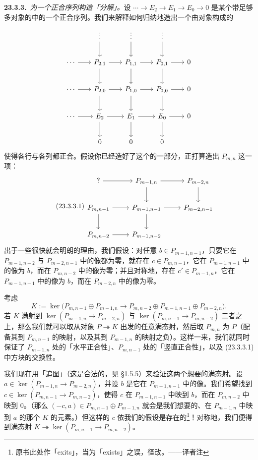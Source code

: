 \textbf{23.3.3.}\ \emph{为一个正合序列构造「\trProjectiveObj{}分解」。}\quad 设 $\cdots\to E_2\to E_1\to E_0\to 0$ 是某个带足够多\trProjectiveObj{}对象的\trAbelianCategory{}中的一个正合序列。我们来解释如何归纳地造出一个由\trProjectiveObj{}对象构成的\trDoubleComplex
\[
\begin{tikzcd}[row sep=2.2em, column sep=1.9em]
 & \vdots \ar[d] & \vdots \ar[d] & \vdots \ar[d] & \\
\cdots \ar[r] & P_{2,1} \ar[r] \ar[d] & P_{1,1} \ar[r] \ar[d] & P_{0,1} \ar[r] \ar[d] & 0 \\
\cdots \ar[r] & P_{2,0} \ar[r] \ar[d] & P_{1,0} \ar[r] \ar[d] & P_{0,0} \ar[r] \ar[d] & 0 \\
\cdots \ar[r] & E_2 \ar[r] \ar[d] & E_1 \ar[r] \ar[d] & E_0 \ar[r] \ar[d] & 0 \\
 & 0 & 0 & 0 &
\end{tikzcd}
\]
使得各行与各列都正合。假设你已经造好了这个\trComplexN{}的一部分，正打算造出 $P_{m,n}$ 这一项：
\begin{equation*}\tag{23.3.3.1}\label{eq:pp-lifting}
\begin{tikzcd}[row sep=2.2em, column sep=2.4em]
? \ar[r] & P_{m-1,n} \ar[r] \ar[d] & P_{m-2,n} \ar[d] \\
P_{m,n-1} \ar[r] \ar[d] & P_{m-1,n-1} \ar[r] \ar[d] & P_{m-2,n-1} \\
P_{m,n-2} \ar[r] & P_{m-1,n-2} &
\end{tikzcd}
\end{equation*}
出于一些很快就会明朗的理由，我们假设：对任意 $b\in P_{m-1,n-1}$，只要它在 $P_{m-1,n-2}$ 与 $P_{m-2,n-1}$ 中的像都为零，就存在 $c\in P_{m,n-1}$，它在 $P_{m-1,n-1}$ 中的像为 $b$，而在 $P_{m,n-2}$ 中的像为零；并且对称地，存在 $c'\in P_{m-1,n}$，它在 $P_{m-1,n-1}$ 中的像为 $b$，而在 $P_{m-2,n}$ 中的像为零。

考虑
\[
K:=\ker\bigl(P_{m,n-1}\oplus P_{m-1,n}\to P_{m,n-2}\oplus P_{m-1,n-1}\oplus P_{m-2,n}\bigr).
\]
若 $K$ 满射到 $\ker(P_{m-1,n}\to P_{m-2,n})$ 与 $\ker(P_{m,n-1}\to P_{m,n-2})$ 二者之上，那么我们就可以取从\trProjectiveObj{}对象 $P\twoheadrightarrow K$ 出发的任意满态射，然后取 $P_{m,n}$ 为 $P$（配备其到 $P_{m,n-1}$ 的映射，以及其到 $P_{m-1,n}$ 的映射之负）。这样一来，我们就同时保证了 $P_{m-1,n}$ 处的「水平正合性」、$P_{m,n-1}$ 处的「竖直正合性」，以及 (23.3.3.1) 中方块的交换性。

我们现在用「追图」（这是合法的，见 \S1.5.5）来验证这两个想要的满态射。设 $a\in\ker(P_{m-1,n}\to P_{m-2,n})$，并设 $b$ 是它在 $P_{m-1,n-1}$ 中的像。我们希望找到 $c\in\ker(P_{m,n-1}\to P_{m,n-2})$，使得 $c$ 在 $P_{m-1,n-1}$ 中映到 $b$，而在 $P_{m,n-2}$ 中映到 $0$。（那么 $(-c,a)\in P_{m,n-1}\oplus P_{m-1,n}$ 就会是我们想要的、在 $P_{m-1,n}$ 中映到 $a$ 的那个 $K$ 的元素。）但这样的 $c$ 依我们的假设是存在的\footnote{原书此处作「exits」，当为「exists」之误，径改。——译者注}！对称地，我们便得到满态射 $K\twoheadrightarrow\ker(P_{m,n-1}\to P_{m,n-2})$。

